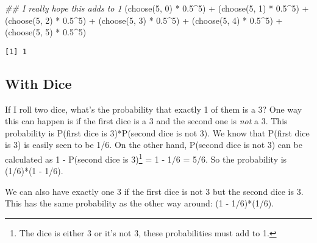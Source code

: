 \documentclass[
  letterpaper,
  DIV=11,
  numbers=noendperiod]{scrreprt}
\newenvironment{Shaded}{\begin{snugshade}}{\end{snugshade}}
\newcommand{\DecValTok}[1]{\textcolor[rgb]{0.68,0.00,0.00}{#1}}
\newcommand{\DocumentationTok}[1]{\textcolor[rgb]{0.37,0.37,0.37}{\textit{#1}}}
\newcommand{\FloatTok}[1]{\textcolor[rgb]{0.68,0.00,0.00}{#1}}
\newcommand{\FunctionTok}[1]{\textcolor[rgb]{0.28,0.35,0.67}{#1}}
\newcommand{\NormalTok}[1]{\textcolor[rgb]{0.00,0.23,0.31}{#1}}
\newcommand{\SpecialCharTok}[1]{\textcolor[rgb]{0.37,0.37,0.37}{#1}}
\begin{document}
\begin{Shaded}
\begin{Highlighting}[]
\DocumentationTok{\#\# I really hope this adds to 1}
\NormalTok{(}\FunctionTok{choose}\NormalTok{(}\DecValTok{5}\NormalTok{, }\DecValTok{0}\NormalTok{) }\SpecialCharTok{*} \FloatTok{0.5}\SpecialCharTok{\^{}}\DecValTok{5}\NormalTok{) }\SpecialCharTok{+}
\NormalTok{  (}\FunctionTok{choose}\NormalTok{(}\DecValTok{5}\NormalTok{, }\DecValTok{1}\NormalTok{) }\SpecialCharTok{*} \FloatTok{0.5}\SpecialCharTok{\^{}}\DecValTok{5}\NormalTok{) }\SpecialCharTok{+}
\NormalTok{  (}\FunctionTok{choose}\NormalTok{(}\DecValTok{5}\NormalTok{, }\DecValTok{2}\NormalTok{) }\SpecialCharTok{*} \FloatTok{0.5}\SpecialCharTok{\^{}}\DecValTok{5}\NormalTok{) }\SpecialCharTok{+}
\NormalTok{  (}\FunctionTok{choose}\NormalTok{(}\DecValTok{5}\NormalTok{, }\DecValTok{3}\NormalTok{) }\SpecialCharTok{*} \FloatTok{0.5}\SpecialCharTok{\^{}}\DecValTok{5}\NormalTok{) }\SpecialCharTok{+}
\NormalTok{  (}\FunctionTok{choose}\NormalTok{(}\DecValTok{5}\NormalTok{, }\DecValTok{4}\NormalTok{) }\SpecialCharTok{*} \FloatTok{0.5}\SpecialCharTok{\^{}}\DecValTok{5}\NormalTok{) }\SpecialCharTok{+}
\NormalTok{  (}\FunctionTok{choose}\NormalTok{(}\DecValTok{5}\NormalTok{, }\DecValTok{5}\NormalTok{) }\SpecialCharTok{*} \FloatTok{0.5}\SpecialCharTok{\^{}}\DecValTok{5}\NormalTok{)}
\end{Highlighting}
\end{Shaded}

\begin{verbatim}
[1] 1
\end{verbatim}

\hypertarget{with-dice}{%
\subsection{With Dice}\label{with-dice}}

If I roll two dice, what's the probability that exactly 1 of them is a
3? One way this can happen is if the first dice is a 3 and the second
one is \emph{not} a 3. This probability is P(first dice is 3)*P(second
dice is not 3). We know that P(first dice is 3) is easily seen to be
1/6. On the other hand, P(second dice is not 3) can be calculated as 1 -
P(second dice is 3)\footnote{The dice is either 3 or it's not 3, these
  probabilities must add to 1.} = 1 - 1/6 = 5/6. So the probability is
(1/6)*(1 - 1/6).

We can also have exactly one 3 if the first dice is not 3 but the second
dice is 3. This has the same probability as the other way around: (1 -
1/6)*(1/6).
\end{document}
